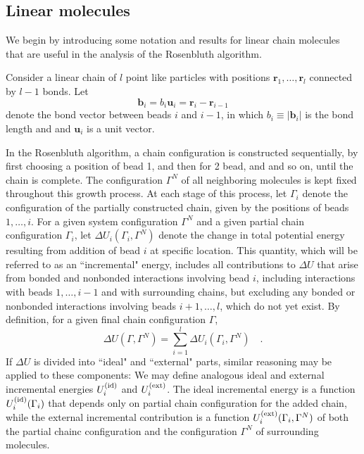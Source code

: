 \documentclass[12pt]{article}
\newcommand{\vv}[1]{\mathbf{#1}}
\newcommand\system{\Gamma^{N}}
\newcommand\chain{\Gamma}
\newcommand\delU{\Delta U}
\newcommand\Uid{U^{({\rm id})}}
\newcommand\Uext{U^{({\rm ext})}}
\newcommand\vbead{\vv{r}}
\newcommand\nbead{l}
\newcommand\vbond{\vv{b}}
\newcommand\ubond{\vv{u}}
\newcommand\rbond{b}
\newcommand\nbond{l-1}
\begin{document}
\subsection{Linear molecules}
We begin by introducing some notation and results for linear chain molecules that are useful in the analysis of the Rosenbluth algorithm.

Consider a linear chain of $\nbead$ point like particles with positions $\vbead_{1},\ldots,\vbead_{\nbead}$ connected by $\nbond$ bonds. Let 
\begin{equation}
   \vbond_{i} = \rbond_{i} \ubond_{i} = \vbead_{i} - \vbead_{i-1}
\end{equation}
denote the bond vector between beads $i$ and $i-1$, in which $\rbond_{i} \equiv |\vbond_{i}|$ is the bond length and and $\ubond_{i}$ is a unit vector.  

In the Rosenbluth algorithm, a chain configuration is constructed sequentially, by first choosing a position of bead 1, and then for 2 bead, and and so on, until the chain is complete.  The configuration $\system$ of all neighboring molecules is kept fixed throughout this growth process. At each stage of this process, let $\chain_{i}$ denote the configuration of the partially constructed chain, given by the positions of beads $1,\ldots,i$. For a given system configuration $\system$ and a given partial chain configuration $\chain_{i}$, let $\delU_{i}(\chain_{i}, \system)$ denote the change in total potential energy resulting from addition of bead $i$ at specific location. This quantity, which will be referred to as an ``incremental" energy, includes all contributions to $\delU$ that arise from bonded and nonbonded interactions involving bead $i$, including interactions with beads $1,\ldots, i-1$ and with surrounding chains, but excluding any bonded or nonbonded interactions involving beads $i+1,\ldots,\nbead$, which do not yet exist. By definition, for a given final chain configuration $\chain$,
\begin{equation}
   \delU(\chain, \system) 
   = \sum_{i=1}^{\nbead} \delU_{i}(\chain_i, \system) 
   \quad.
\end{equation}
If $\delU$ is divided into ``ideal" and ``external" parts, similar reasoning may be applied to these components: We may define analogous ideal and external incremental energies $\Uid_{i}$ and $\Uext_{i}$. The ideal incremental energy is a function $\Uid_{i}(\chain_{i})$ that depends only on partial chain configuration for the added chain, while the external incremental contribution is a function $\Uext_{i}(\chain_{i}, \system)$ of both the partial chainc configuration and the configuration $\system$ of surrounding molecules.
\end{document}
